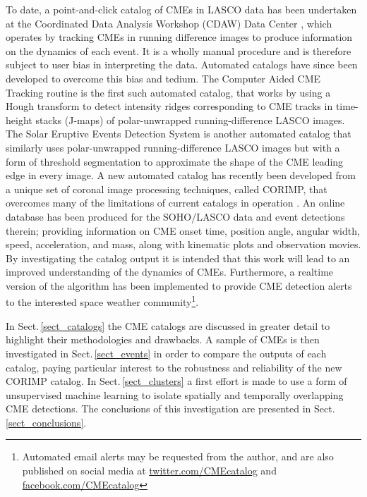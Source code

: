 \documentclass[referee,a4paper,12pt,traditabstract]{swsc}
\begin{document}
\begin{linenumbers}
To date, a point-and-click catalog of CMEs in LASCO data has been undertaken at the Coordinated Data Analysis Workshop (CDAW) Data Center \citep{2009EM&P..104..295G}, which operates by tracking CMEs in running difference images to produce information on the dynamics of each event. It is a wholly manual procedure and is therefore subject to user bias in interpreting the data. Automated catalogs have since been developed to overcome this bias and tedium. The Computer Aided CME Tracking routine \cite[CACTus;][]{2004A&A...425.1097R} is the first such automated catalog, that works by using a Hough transform \citep{Hough1962} to detect intensity ridges corresponding to CME tracks in time-height stacks (J-maps) of polar-unwrapped running-difference LASCO images. The Solar Eruptive Events Detection System \cite[SEEDS;][]{2008SoPh..248..485O} is another automated catalog that similarly uses polar-unwrapped running-difference LASCO images but with a form of threshold segmentation to approximate the shape of the CME leading edge in every image. A new automated catalog has recently been developed from a unique set of coronal image processing techniques, called CORIMP, that overcomes many of the limitations of current catalogs in operation \citep{2012ApJ...752..144M,2012ApJ...752..145B}. An online database has been produced for the SOHO/LASCO data and event detections therein; providing information on CME onset time, position angle, angular width, speed, acceleration, and mass, along with kinematic plots and observation movies. By investigating the catalog output it is intended that this work will lead to an improved understanding of the dynamics of CMEs. Furthermore, a realtime version of the algorithm has been implemented to provide CME detection alerts to the interested space weather community\footnote{Automated email alerts may be requested from the author, and are also published on social media at \href{https://www.twitter.com/CMEcatalog}{twitter.com/CMEcatalog} and \href{https://www.facebook.com/CMEcatalog}{facebook.com/CMEcatalog}}.

In Sect.\,\ref{sect_catalogs} the CME catalogs are discussed in greater detail to highlight their methodologies and drawbacks. A sample of CMEs is then investigated in Sect.\,\ref{sect_events} in order to compare the outputs of each catalog, paying particular interest to the robustness and reliability of the new CORIMP catalog. In Sect.\,\ref{sect_clusters} a first effort is made to use a form of unsupervised machine learning to isolate spatially and temporally overlapping CME detections. The conclusions of this investigation are presented in Sect.\,\ref{sect_conclusions}.


\end{linenumbers}
\end{document}
